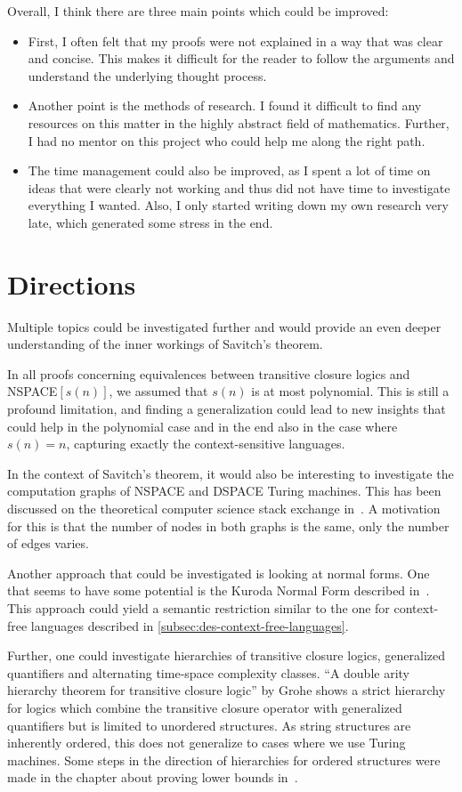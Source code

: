 Overall, I think there are three main points which could be improved:
\begin{itemize}
    \setlength\itemsep{0.2em}
    \item First, I often felt that my proofs were not explained in a way that was clear and concise.
    This makes it difficult for the reader to follow the arguments and understand the underlying thought process. %
    \item Another point is the methods of research.
    I found it difficult to find any resources on this matter in the highly abstract field of mathematics.
    Further, I had no mentor on this project who could help me along the right path.
    \item The time management could also be improved, as I spent a lot of time on ideas that were clearly not working and thus did not have time to investigate everything I wanted.
    Also, I only started writing down my own research very late, which generated some stress in the end.
\end{itemize}

\section{Directions}\label{sec:directions}
Multiple topics could be investigated further and would provide an even deeper understanding of the inner workings of Savitch's theorem.

In all proofs concerning equivalences between transitive closure logics and NSPACE$[s(n)]$, we assumed that $s(n)$ is at most polynomial.
This is still a profound limitation, and finding a generalization could lead to new insights that could help in the polynomial case and in the end also in the case where $s(n) = n$, capturing exactly the context-sensitive languages.

In the context of Savitch's theorem, it would also be interesting to investigate the computation graphs of NSPACE and DSPACE Turing machines.
This has been discussed on the theoretical computer science stack exchange in~\cite{Barak2010}.
A motivation for this is that the number of nodes in both graphs is the same, only the number of edges varies.

Another approach that could be investigated is looking at normal forms.
One that seems to have some potential is the Kuroda Normal Form described in~\cite{Kuroda1964}.
This approach could yield a semantic restriction similar to the one for context-free languages described in \cref{subsec:des-context-free-languages}.

Further, one could investigate hierarchies of transitive closure logics, generalized quantifiers and alternating time-space complexity classes.
``A double arity hierarchy theorem for transitive closure logic''\cite{Grohe1996} by Grohe shows a strict hierarchy for logics which combine the transitive closure operator with generalized quantifiers but is limited to unordered structures.
As string structures are inherently ordered, this does not generalize to cases where we use Turing machines.
Some steps in the direction of hierarchies for ordered structures were made in the chapter about proving lower bounds in~\cite{descriptive-complexity}.